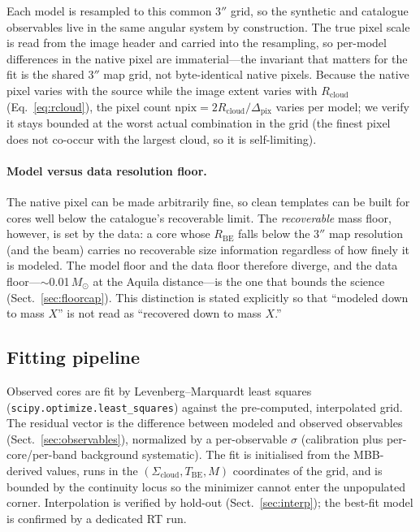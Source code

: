 \documentclass[11pt,a4paper]{article}
\newcommand{\msun}{M_{\odot}}
\newcommand{\Rbe}{R_{\mathrm{BE}}}
\newcommand{\Tbe}{T_{\mathrm{BE}}}
\newcommand{\Scloud}{\Sigma_{\mathrm{cloud}}}
\newcommand{\Rcloud}{R_{\mathrm{cloud}}}
\begin{document}
Each model is resampled to this common $3''$ grid, so the synthetic and
catalogue observables live in the same angular system by construction. The
true pixel scale is read from the image header and carried into the
resampling, so per-model differences in the native pixel are immaterial---the
invariant that matters for the fit is the shared $3''$ map grid, not
byte-identical native pixels. Because the native pixel varies with the
source while the image extent varies with $\Rcloud$
(Eq.~\ref{eq:rcloud}), the pixel count $\mathrm{npix}=2\Rcloud/\Delta_{\mathrm{pix}}$
varies per model; we verify it stays bounded at the worst actual
combination in the grid (the finest pixel does not co-occur with the largest
cloud, so it is self-limiting).

\paragraph{Model versus data resolution floor.} The native pixel can be made
arbitrarily fine, so clean templates can be built for cores well below the
catalogue's recoverable limit. The \emph{recoverable} mass floor, however, is
set by the data: a core whose $\Rbe$ falls below the $3''$ map resolution
(and the beam) carries no recoverable size information regardless of how
finely it is modeled. The model floor and the data floor therefore diverge,
and the data floor---$\sim$0.01\,$\msun$ at the Aquila distance---is the one
that bounds the science (Sect.~\ref{sec:floorcap}). This distinction is
stated explicitly so that ``modeled down to mass $X$'' is not read as
``recovered down to mass $X$.''

\subsection{Fitting pipeline}
\label{sec:fitting}

Observed cores are fit by Levenberg--Marquardt least squares
(\texttt{scipy.optimize.least\_squares}) against the pre-computed,
interpolated grid. The residual vector is the difference between modeled
and observed observables (Sect.~\ref{sec:observables}), normalized by a
per-observable $\sigma$ (calibration plus per-core/per-band background
systematic). The fit is initialised from the MBB-derived values, runs in
the $(\Scloud,\Tbe,M)$ coordinates of the grid, and is bounded by the
continuity locus so the minimizer cannot enter the unpopulated corner.
Interpolation is verified by hold-out (Sect.~\ref{sec:interp}); the
best-fit model is confirmed by a dedicated RT run.
\end{document}
